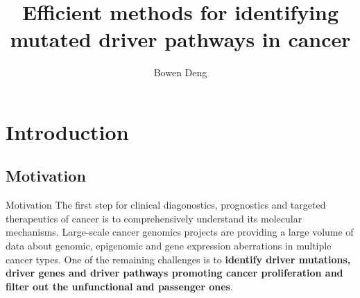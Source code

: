 \documentclass[xcolor=dvipsnames]{beamer}
\begin{document}
\title{Efficient methods for identifying mutated driver pathways in cancer}
\author{Bowen Deng}
\date{}
\begin{frame}
\maketitle
\end{frame}
\section{Introduction}
\subsection{Motivation}
\begin{frame}{Motivation}
The first step for clinical diagonostics, prognostics and targeted therapeutics of cancer is to comprehensively understand its molecular mechanisms. Large-scale cancer genomics projects are providing a large volume of data about genomic, epigenomic and gene expression aberrations in multiple cancer types. One of the remaining challenges is to \textbf{identify driver mutations, driver genes and driver pathways promoting cancer proliferation and filter out the unfunctional and passenger ones}.
\end{frame}
\end{document}

